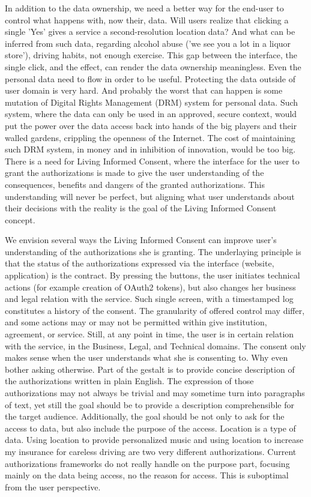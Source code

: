 In addition to the data ownership, we need a better way for the end-user to control what happens with, now their, data. 
Will users realize that clicking a single 'Yes' gives a service a second-resolution location data? 
And what can be inferred from such data, regarding alcohol abuse ('we see you a lot in a liquor store'), driving habits, not enough exercise. 
This gap between the interface, the single click, and the effect, can render the data ownership meaningless.
Even the personal data need to flow in order to be useful.
Protecting the data outside of user domain is very hard.
And probably the worst that can happen is some mutation of Digital Rights Management (DRM) system for personal data.
Such system, where the data can only be used in an approved, secure context, would put the power over the data access back into hands of the big players and their walled gardens, crippling the openness of the Internet.
The cost of maintaining such DRM system, in money and in inhibition of innovation, would be too big. 
There is a need for Living Informed Consent, where the interface for the user to grant the authorizations is made to give the user understanding of the consequences, benefits and dangers of the granted authorizations.
This understanding will never be perfect, but aligning what user understands about their decisions with the reality is the goal of the Living Informed Consent concept. 

We envision several ways the Living Informed Consent can improve user's understanding of the authorizations she is granting. 
The underlaying principle is that the status of the authorizations expressed via the interface (website, application) is the contract.
By pressing the buttons, the user initiates technical actions (for example creation of OAuth2 tokens), but also changes her business and legal relation with the service.
Such single screen, with a timestamped log constitutes a history of the consent. 
The granularity of offered control may differ, and some actions may or may not be permitted within give institution, agreement, or service.
Still, at any point in time, the user is in certain relation with the service, in the Business, Legal, and Technical domains. 
The consent only makes sense when the user understands what she is consenting to.
Why even bother asking otherwise.
Part of the gestalt is to provide concise description of the authorizations written in plain English.
The expression of those authorizations may not always be trivial and may sometime turn into paragraphs of text, yet still the goal should be to provide a description comprehensible for the target audience.
Additionally, the goal should be not only to ask for the access to data, but also include the purpose of the access.
Location is a type of data.
Using location to provide personalized music and using location to increase my insurance for careless driving are two very different authorizations.
Current authorizations frameworks do not really handle on the purpose part, focusing mainly on the data being access, no the reason for access.
This is suboptimal from the user perspective. 

